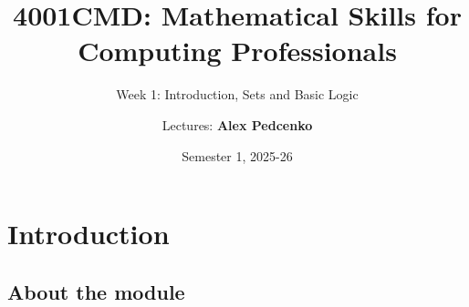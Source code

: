 \documentclass[11pt,aspectratio=1610]{beamer}
\title{4001CMD: Mathematical Skills for Computing Professionals}
\subtitle[Week 1: Sets and Logic]{Week 1: Introduction, Sets and Basic Logic}
\date{Semester 1, 2025-26}
\author{Lectures: \textbf{Alex Pedcenko}}
\begin{document}
	
	\begin{frame}
		\titlepage
	\end{frame}
	
	
	\section{Introduction}	
		
		
		
		
		\subsection*{About the module}	
		
\end{document}
